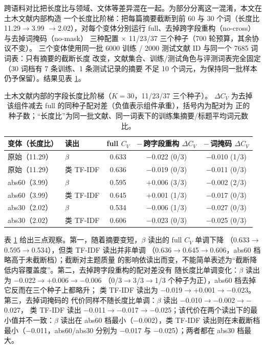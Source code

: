 \documentclass[11pt]{ctexart}
\begin{document}
跨语料对比把长度比与领域、文体等差异混在一起。为部分分离这一混淆，本文在土木文献内部构造
一个长度比阶梯：把每篇摘要截断到前 60 与 30 个词（长度比 11.29$\rightarrow$3.99
$\rightarrow$2.02），对每个变体分别运行 full、去掉跨字段重构（no-cross）与去掉词掩码（no-mask）
三种配置 $\times$ 11/23/37 三个种子（700 轮预算，其余协议不变）。
三个变体使用同一批 6000 训练 / 2000 测试文献 ID 与同一个 7685 词词表：只有摘要的截断长度
改变，文献集合、训练/测试角色与评测词表完全固定（30 词档有 7 条训练、1 条测试记录的摘要
不足 10 个词元，为保持同一批样本仍予保留）。结果见表 \ref{tab:ladder}。

\begin{table}[t]
\centering
\caption{土木文献内部的字段长度比阶梯（$K=30$，11/23/37 三个种子）。
$\Delta C_V$ 为去掉该组件减去 full 的同种子配对差（负值表示组件承重），括号内为配对为
正的种子数；“长度比”为同一批文献、同一词表下的训练集摘要/标题平均词元数比。}
\label{tab:ladder}
\small
\setlength{\tabcolsep}{4pt}
\begin{tabular}{@{}llccc@{}}
\toprule
变体（长度比） & 读出 & full $C_V$ & $-\hspace{2pt}$跨字段重构 $\Delta C_V$
 & $-\hspace{2pt}$词掩码 $\Delta C_V$ \\
\midrule
原始（11.29） & $\beta$ & 0.633 & $-$0.022 (0/3) & $-$0.010 (1/3) \\
原始（11.29） & 类 TF-IDF & 0.636 & $-$0.019 (0/3) & $-$0.011 (0/3) \\
abs60（3.99） & $\beta$ & 0.595 & $+$0.006 (3/3) & $-$0.002 (2/3) \\
abs60（3.99） & 类 TF-IDF & 0.645 & $+$0.001 (1/3) & $-$0.017 (0/3) \\
abs30（2.02） & $\beta$ & 0.534 & $-$0.006 (1/3) & $-$0.027 (0/3) \\
abs30（2.02） & 类 TF-IDF & 0.606 & $-$0.023 (0/3) & $-$0.025 (0/3) \\
\bottomrule
\end{tabular}
\end{table}

表 \ref{tab:ladder} 给出三点观察。第一，随着摘要变短，$\beta$ 读出的 full $C_V$ 单调下降
（0.633$\rightarrow$0.595$\rightarrow$0.534），但类 TF-IDF 读出并非单调
（0.636$\rightarrow$0.645$\rightarrow$0.606，abs60 档略高于未截断档）；截断对主题质量
的影响依读出而变，不能简单表述为“截断降低内容覆盖度”。第二，去掉跨字段重构的配对差没有
随长度比单调变化：$\beta$ 读出为 $-$0.022$\rightarrow$$+$0.006$\rightarrow$$-$0.006
（0/3$\rightarrow$3/3$\rightarrow$1/3 个种子为正），abs60 档去掉它反而在三个种子上都略升；
类 TF-IDF 读出为 $-$0.019$\rightarrow$$+$0.001$\rightarrow$$-$0.023。第三，去掉词掩码的
代价同样不随长度比单调：$\beta$ 读出 $-$0.010$\rightarrow$$-$0.002$\rightarrow$$-$0.027，
类 TF-IDF 读出 $-$0.011$\rightarrow$$-$0.017$\rightarrow$$-$0.025；该代价在两个读出下的最小值并不一致：$\beta$ 读出在 abs60 档最小（$-$0.002），类 TF-IDF
读出则在未截断档最小（$-$0.011，abs60/abs30 分别为 $-$0.017 与 $-$0.025）；两者都在
abs30 档最大。
\end{document}
